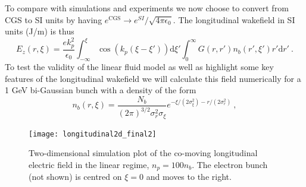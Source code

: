 To compare with simulations and experiments we now choose to convert from CGS to SI units by having $e^{\text{CGS}}\to e^{SI}/\sqrt{4\pi\epsilon_0}$. The longitudinal wakefield in SI units (J/m) is thus
\begin{equation}
E_z(r,\xi)=\frac{e k_p^2}{\epsilon_0} \int_{-\infty}^{\xi} \cos(k_p(\xi-\xi'))\mathrm{d}\xi' \int_{0}^{\infty}G\left(r,r'\right) n_b(r',\xi')r'\mathrm{d}r'~.
\label{longitudinalforce}
\end{equation}
To test the validity of the linear fluid model as well as highlight some key features of the longitudinal wakefield we will calculate this field numerically for a 1 GeV bi-Gaussian bunch with a density of the form
\begin{equation}
n_b(r,\xi)=\frac{N_b}{(2\pi)^{3/2}\sigma_r^2\sigma_{\xi}}e^{-\xi/(2\sigma_{\xi}^2)-r/(2\sigma_{r}^2)}~,
\label{bigaussian}
\end{equation}
\begin{figure}
\centering
\texttt{[image: longitudinal2d\_final2]}
\caption{\small{Two-dimensional simulation plot of the co-moving longitudinal electric field in the linear regime, $n_p=100n_b$. The electron bunch (not shown) is centred on $\xi=0$ and moves to the right.}}
\label{longitudinal_plot}
\end{figure}
\clearpage
